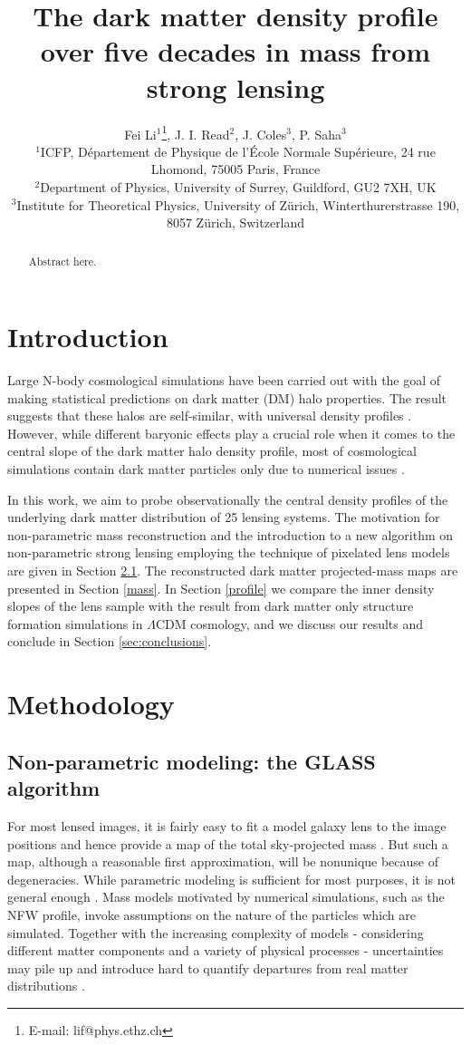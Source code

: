 \documentclass[useAMS,usenatbib]{mn2e}
\title[The dark matter density profile over five decades in mass]{The dark matter density profile over five decades in mass from strong lensing}
\author[Li]{Fei Li$^1$\thanks{E-mail: lif@phys.ethz.ch}, J. I. Read$^2$, J. Coles$^3$, P. Saha$^3$\\
$^1$ICFP, D\'{e}partement de Physique de l'\'{E}cole Normale Sup\'{e}rieure, 24 rue Lhomond, 75005 Paris, France\\
$^2$Department of Physics, University of Surrey, Guildford, GU2 7XH, UK\\
$^3$Institute for Theoretical Physics, University of Z\"urich, Winterthurerstrasse 190, 8057 Z\"urich, Switzerland
}
\begin{document}
\maketitle

\begin{abstract}
Abstract here. 
\end{abstract}

\begin{keywords}
\end{keywords}

\section{Introduction}\label{sec:introduction}

Large N-body cosmological simulations have been carried out with the goal of making statistical predictions on dark matter (DM) halo properties. The result suggests that these halos are self-similar, with universal density profiles \citep[see e.g.,][]{Navarro, Diemand, Hayashi, Merritt, Graham, Moore}. However, while different baryonic effects play a crucial role when it comes to the central slope of the dark matter halo density profile, most of cosmological simulations contain dark matter particles only due to numerical issues \cite[see][]{Mayer}. 

In this work, we aim to probe observationally the central density profiles of the underlying dark matter distribution of 25 lensing systems. The motivation for non-parametric mass reconstruction and the introduction to a new algorithm on non-parametric strong lensing employing the technique of pixelated lens models are given in Section \ref{parametric}. The reconstructed dark matter projected-mass maps are presented in Section \ref{mass}. In Section \ref{profile} we compare the inner density slopes of the lens sample with the result from dark matter only structure formation simulations in $\Lambda$CDM cosmology, and we discuss our results and conclude in Section \ref{sec:conclusions}.




\section{Methodology}\label{sec:method}
\subsection{Non-parametric modeling: the GLASS algorithm}\label{parametric}
For most lensed images, it is fairly easy to fit a model galaxy lens to the image positions and hence provide a map of the total sky-projected mass \citep{IF}. But such a map, although a reasonable first approximation, will be nonunique because of degeneracies. While parametric modeling is sufficient for most purposes, it is not general enough \citep{Kneib, Nata}. Mass models motivated by numerical simulations, such as the NFW profile, invoke assumptions on the nature of the particles which are simulated. Together with the increasing complexity of models - considering different matter components and a variety of physical processes - uncertainties may pile up and introduce hard to quantify departures from real matter distributions \citep{DL}. 
\end{document}
